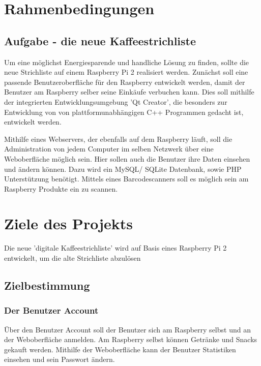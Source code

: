\documentclass[11pt,a4paper]{article} %
\begin{document}

\section{Rahmenbedingungen}


\subsection{Aufgabe - die neue Kaffeestrichliste}
\label{SchriftAnpassen}

Um eine m\"oglichst Energiesparende und handliche L\"osung zu finden, sollte die neue Strichliste auf einem Raspberry Pi 2 realisiert werden. Zun\"achst soll eine passende Benutzeroberfl\"ache f\"ur den Raspberry entwickelt werden, damit der Benutzer am Raspberry selber seine Eink\"aufe verbuchen kann. Dies soll mithilfe der integrierten Entwicklungsumgebung 'Qt Creator', die besonders zur Entwicklung von von plattformunabh\"angigen C++ Programmen gedacht ist, entwickelt werden.
\par
Mithilfe eines Webservers, der ebenfalls auf dem Raspberry l\"auft, soll die Administration von jedem Computer im selben Netzwerk \"uber eine Weboberfl\"ache m\"oglich sein. Hier sollen auch die Benutzer ihre Daten einsehen und \"andern k\"onnen. Dazu wird ein MySQL/ SQLite Datenbank, sowie PHP Unterst\"utzung ben\"otigt. Mittels eines Barcodescanners soll es m\"oglich sein am Raspberry Produkte ein zu scannen.


\section{Ziele des Projekts}
Die neue 'digitale Kaffeestrichliste' wird auf Basis eines Raspberry Pi 2 entwickelt, um die alte Strichliste abzul\"osen
\subsection{Zielbestimmung}
\label{Ausrichtung}

\subsubsection{Der Benutzer Account}
\"Uber den Benutzer Account soll der Benutzer sich am Raspberry selbst und an der Weboberfl\"ache anmelden. Am Raspberry selbst k\"onnen Getr\"anke und Snacks gekauft werden. Mithilfe der Weboberfl\"ache kann der Benutzer Statistiken einsehen und sein Passwort \"andern.
\end{document}
